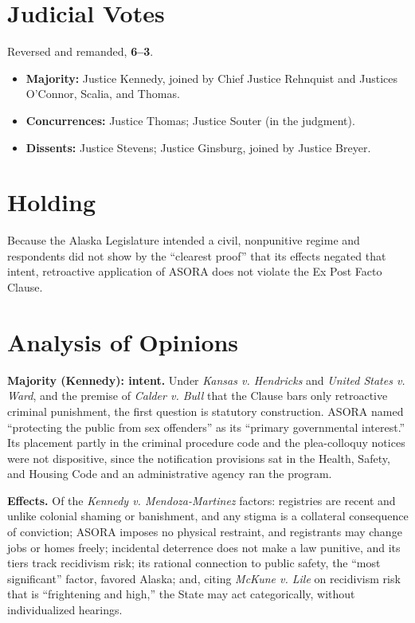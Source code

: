 \documentclass[12pt]{article}
\begin{document}
\section{Judicial Votes}

Reversed and remanded, \textbf{6--3}.
\begin{itemize}
\item \textbf{Majority:} Justice Kennedy, joined by Chief Justice Rehnquist and Justices O'Connor, Scalia, and Thomas.
\item \textbf{Concurrences:} Justice Thomas; Justice Souter (in the judgment).
\item \textbf{Dissents:} Justice Stevens; Justice Ginsburg, joined by Justice Breyer.
\end{itemize}

\section{Holding}

Because the Alaska Legislature intended a civil, nonpunitive regime and respondents did not show by the ``clearest proof'' that its effects negated that intent, retroactive application of ASORA does not violate the Ex Post Facto Clause.

\section{Analysis of Opinions}

\textbf{Majority (Kennedy): intent.} Under \textit{Kansas v. Hendricks} and \textit{United States v. Ward}, and the premise of \textit{Calder v. Bull} that the Clause bars only retroactive criminal punishment, the first question is statutory construction. ASORA named ``protecting the public from sex offenders'' as its ``primary governmental interest.'' Its placement partly in the criminal procedure code and the plea-colloquy notices were not dispositive, since the notification provisions sat in the Health, Safety, and Housing Code and an administrative agency ran the program.

\textbf{Effects.} Of the \textit{Kennedy v. Mendoza-Martinez} factors: registries are recent and unlike colonial shaming or banishment, and any stigma is a collateral consequence of conviction; ASORA imposes no physical restraint, and registrants may change jobs or homes freely; incidental deterrence does not make a law punitive, and its tiers track recidivism risk; its rational connection to public safety, the ``most significant'' factor, favored Alaska; and, citing \textit{McKune v. Lile} on recidivism risk that is ``frightening and high,'' the State may act categorically, without individualized hearings.
\end{document}
